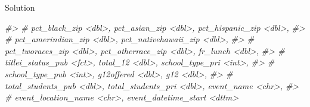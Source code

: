 \documentclass[
  8pt,
  ignorenonframetext,
  dvipsnames]{beamer}
\newenvironment{Shaded}{\begin{snugshade}}{\end{snugshade}}
\newcommand{\CommentTok}[1]{\textcolor[rgb]{0.56,0.35,0.01}{\textit{#1}}}
\begin{document}
\begin{frame}[fragile]{Solution}
\begin{Shaded}
\begin{Highlighting}[]
\CommentTok{\#\textgreater{} \#   pct\_black\_zip \textless{}dbl\textgreater{}, pct\_asian\_zip \textless{}dbl\textgreater{}, pct\_hispanic\_zip \textless{}dbl\textgreater{},}
\CommentTok{\#\textgreater{} \#   pct\_amerindian\_zip \textless{}dbl\textgreater{}, pct\_nativehawaii\_zip \textless{}dbl\textgreater{},}
\CommentTok{\#\textgreater{} \#   pct\_tworaces\_zip \textless{}dbl\textgreater{}, pct\_otherrace\_zip \textless{}dbl\textgreater{}, fr\_lunch \textless{}dbl\textgreater{},}
\CommentTok{\#\textgreater{} \#   titlei\_status\_pub \textless{}fct\textgreater{}, total\_12 \textless{}dbl\textgreater{}, school\_type\_pri \textless{}int\textgreater{},}
\CommentTok{\#\textgreater{} \#   school\_type\_pub \textless{}int\textgreater{}, g12offered \textless{}dbl\textgreater{}, g12 \textless{}dbl\textgreater{},}
\CommentTok{\#\textgreater{} \#   total\_students\_pub \textless{}dbl\textgreater{}, total\_students\_pri \textless{}dbl\textgreater{}, event\_name \textless{}chr\textgreater{},}
\CommentTok{\#\textgreater{} \#   event\_location\_name \textless{}chr\textgreater{}, event\_datetime\_start \textless{}dttm\textgreater{}}
\end{Highlighting}
\end{Shaded}
\end{frame}
\end{document}
